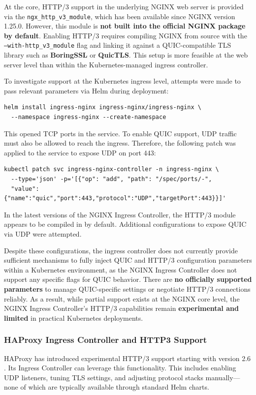 At the core, HTTP/3 support in the underlying NGINX web server is provided via the \texttt{ngx\_http\_v3\_module}, which has been available since NGINX version 1.25.0. However, this module is \textbf{not built into the official NGINX package by default}. Enabling HTTP/3 requires compiling NGINX from source with the \texttt{--with-http\_v3\_module} flag and linking it against a QUIC-compatible TLS library such as \textbf{BoringSSL} or \textbf{QuicTLS}. This setup is more feasible at the web server level than within the Kubernetes-managed ingress controller.

To investigate support at the Kubernetes ingress level, attempts were made to pass relevant parameters via Helm during deployment:

\begin{verbatim}
helm install ingress-nginx ingress-nginx/ingress-nginx \
  --namespace ingress-nginx --create-namespace
\end{verbatim}

This opened TCP ports in the service. To enable QUIC support, UDP traffic must also be allowed to reach the ingress. Therefore, the following patch was applied to the service to expose UDP on port 443:

\begin{verbatim}
kubectl patch svc ingress-nginx-controller -n ingress-nginx \
  --type='json' -p='[{"op": "add", "path": "/spec/ports/-", 
  "value": {"name":"quic","port":443,"protocol":"UDP","targetPort":443}}]'
\end{verbatim}

In the latest versions of the NGINX Ingress Controller, the HTTP/3 module appears to be compiled in by default. Additional configurations to expose QUIC via UDP were attempted.

Despite these configurations, the ingress controller does not currently provide sufficient mechanisms to fully inject QUIC and HTTP/3 configuration parameters within a Kubernetes environment, as the NGINX Ingress Controller does not support any specific flags for QUIC behavior. There are \textbf{no officially supported parameters} to manage QUIC-specific settings or negotiate HTTP/3 connections reliably. As a result, while partial support exists at the NGINX core level, the NGINX Ingress Controller's HTTP/3 capabilities remain \textbf{experimental and limited} in practical Kubernetes deployments.



\subsubsection{HAProxy Ingress Controller and HTTP3 Support}
HAProxy has introduced experimental HTTP/3 support starting with version 2.6 \cite{haproxy-docs} \cite{haproxy-k8s-docs}. Its Ingress Controller can leverage this functionality. This includes enabling UDP listeners, tuning TLS settings, and adjusting protocol stacks manually—none of which are typically available through standard Helm charts. 


